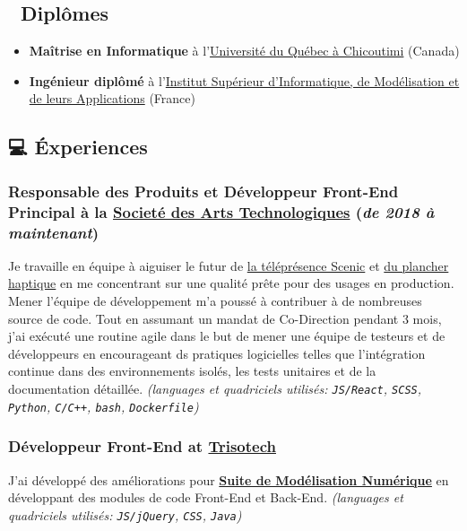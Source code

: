 \documentclass[11pt]{article}
\begin{document}
\subsection{🏫 Diplômes}
\label{sec:org91773d2}
\begin{itemize}
\item \textbf{Maîtrise en Informatique} à l'\href{https://www.uqac.ca/}{Université du Québec à Chicoutimi} (Canada)
\item \textbf{Ingénieur diplômé} à l'\href{https://www.clermont-auvergne-inp.fr/ecoles/isima/}{Institut Supérieur d’Informatique, de Modélisation et de leurs Applications} (France)
\end{itemize}

\subsection{💻 Éxperiences}
\label{sec:org0ecdbc9}
\subsubsection{\textbf{Responsable des Produits} et \textbf{Développeur Front-End Principal} à la \href{https://sat.qc.ca/}{Societé des Arts Technologiques} (\emph{de 2018 à maintenant})}
\label{sec:orgb4268ff}
Je travaille en équipe à aiguiser le futur de \href{https://gitlab.com/sat-mtl/tools/scenic/scenic}{la téléprésence Scenic} et \href{https://gitlab.com/sat-mtl/tools/haptic-floor}{du plancher haptique} en me concentrant sur une qualité prête pour des usages en production. Mener l'équipe de développement m'a poussé à contribuer à de nombreuses source de code. Tout en assumant un mandat de Co-Direction pendant 3 mois, j'ai exécuté une routine agile dans le but de mener une équipe de testeurs et de développeurs en encourageant ds pratiques logicielles telles que l'intégration continue dans des environnements isolés, les tests unitaires et de la documentation détaillée.
\emph{(languages et quadriciels utilisés: \texttt{JS/React}, \texttt{SCSS}, \texttt{Python}, \texttt{C/C++}, \texttt{bash}, \texttt{Dockerfile})}
\subsubsection{\textbf{Développeur Front-End} at \href{https://www.trisotech.com/}{Trisotech}}
\label{sec:orgaac0755}
J'ai développé des améliorations pour \href{https://www.trisotech.com/digital-modeling-suite/}{\textbf{Suite de Modélisation Numérique}} en développant des modules de code Front-End et Back-End.
\emph{(languages et quadriciels utilisés: \texttt{JS/jQuery}, \texttt{CSS}, \texttt{Java})}
\end{document}
